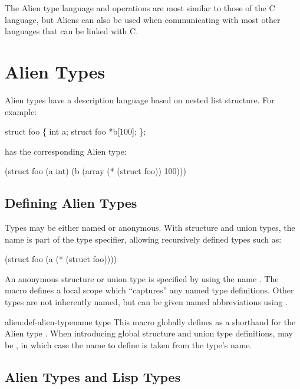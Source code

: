 The Alien type language and operations are most similar to those of the
C language, but Aliens can also be used when communicating with most
other languages that can be linked with C.


\section{Alien Types}

Alien types have a description language based on nested list structure.  For
example:

\begin{example}
struct foo \{
    int a;
    struct foo *b[100];
\};
\end{example}

has the corresponding Alien type:

\begin{lisp}
(struct foo
  (a int)
  (b (array (* (struct foo)) 100)))
\end{lisp}


\subsection{Defining Alien Types}

Types may be either named or anonymous.  With structure and union
types, the name is part of the type specifier, allowing recursively
defined types such as:

\begin{lisp}
(struct foo (a (* (struct foo))))
\end{lisp}

An anonymous structure or union type is specified by using the name
\nil{}.  The  macro defines a local scope which
``captures'' any named type definitions.  Other types are not
inherently named, but can be given named abbreviations using
.

\begin{defmac}{alien:}{def-alien-type}{name type}  
  This macro globally defines  as a shorthand for the Alien
  type .  When introducing global structure and union type
  definitions,  may be \nil, in which case the name to
  define is taken from the type's name.
\end{defmac}


\subsection{Alien Types and Lisp Types}

